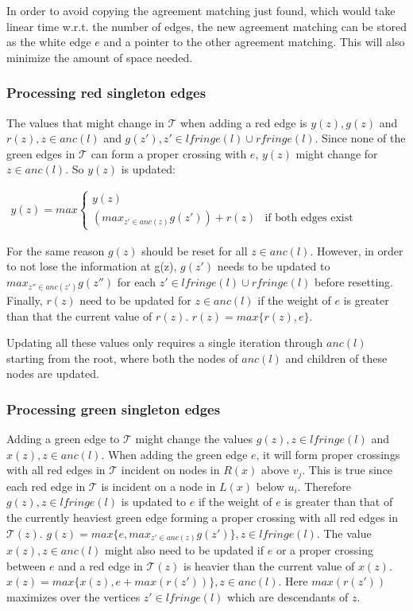 In order to avoid copying the agreement matching just found, which would take linear time w.r.t. the number of edges, the new agreement matching can be stored as the white edge $e$ and a pointer to the other agreement matching. This will also minimize the amount of space needed.

\subsubsection{Processing red singleton edges}
The values that might change in $\mathcal{T}$ when adding a red edge is $y(z), g(z)$ and $r(z), z \in anc(l)$ and $g(z'), z' \in lfringe(l) \cup rfringe(l)$. Since none of the green edges in $\mathcal{T}$ can form a proper crossing with $e$, $y(z)$ might change for $z \in anc(l)$. So $y(z)$ is updated:

\begin{equation*}
\begin{aligned}
y(z)=max
\begin{cases}
y(z)
\\
(max_{z' \in anc(z)} g(z')) + r(z) & \text{if both edges exist}             
\end{cases}
\end{aligned}
\phantom{\hspace{6cm}}
\end{equation*}

For the same reason $g(z)$ should be reset for all $z \in anc(l)$. However, in order to not lose the information at g(z), $g(z')$ needs to be updated to $max_{z'' \in anc(z')} g(z'')$ for each $z' \in lfringe(l) \cup rfringe(l)$ before resetting. Finally, $r(z)$ need to be updated for $z \in anc(l)$ if the weight of $e$ is greater than that the current value of $r(z)$. $r(z)=max\{r(z), e\}$.

Updating all these values only requires a single iteration through $anc(l)$ starting from the root, where both the nodes of $anc(l)$ and children of these nodes are updated.

\subsubsection{Processing green singleton edges}
Adding a green edge to $\mathcal{T}$ might change the values $g(z), z \in lfringe(l)$ and $x(z), z \in anc(l)$. When adding the green edge $e$, it will form proper crossings with all red edges in $\mathcal{T}$ incident on nodes in $R(x)$ above $v_j$. This is true since each red edge in $\mathcal{T}$ is incident on a node in $L(x)$ below $u_i$. Therefore $g(z), z \in lfringe(l)$ is updated to $e$ if the weight of $e$ is greater than that of the currently heaviest green edge forming a proper crossing with all red edges in $\mathcal{T}(z)$. $g(z)=max\{e, max_{z' \in anc(z)} g(z')\}, z \in lfringe(l)$. The value $x(z), z \in anc(l)$ might also need to be updated if $e$ or a proper crossing between $e$ and a red edge in $\mathcal{T}(z)$ is heavier than the current value of $x(z)$. $x(z)=max\{x(z), e + max(r(z'))\}, z \in anc(l)$. Here $max(r(z'))$ maximizes over the vertices $z' \in lfringe(l)$ which are descendants of $z$.

